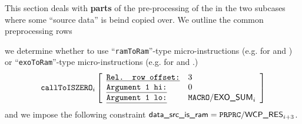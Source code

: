\begin{center}
\end{center}
This section deals with \textbf{parts} of the pre-processing of the \mmuInstAnyToRamWithPadding{}
in the two subcases where some ``source data'' is beind copied over.
We outline the common preprocessing rows
\begin{description}
	\def\rowNum{3} \item[\underline{Processing row $n^\circ(i + \rowNum)$:}]
		we determine whether to use
		``\texttt{ramToRam}''-type micro-instructions (e.g. for  and ) or
		``\texttt{exoToRam}''-type micro-instructions (e.g. for  and .)
		\[
			\callToIszero
			{i}{\rowNum}
			{0}{\macroExoSum_{i}}
		\]
		and we impose the following constraint $\locDataSourceIsRam = \ppWcpRes_{i + \rowNum}$.


\end{description}

